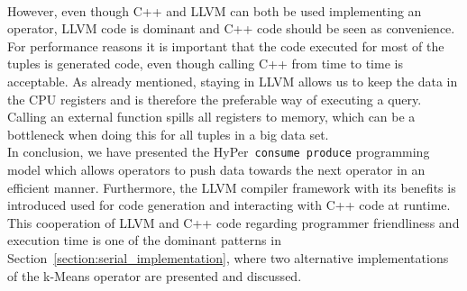 \\
However, even though C++ and LLVM can both be used implementing an operator, LLVM code is dominant and C++ code should be seen as convenience. For performance reasons it is important that the code executed for most of the tuples is generated code, even though calling C++ from time to time is acceptable. As already mentioned, staying in LLVM allows us to keep the data in the CPU registers and is therefore the preferable way of executing a query. Calling an external function spills all registers to memory, which can be a bottleneck when doing this for all tuples in a big data set.
\\
In conclusion, we have presented the HyPer~\texttt{consume produce} programming model which allows operators to push data towards the next operator in an efficient manner. Furthermore, the LLVM compiler framework with its benefits is introduced used for code generation and interacting with C++ code at runtime. 
This cooperation of LLVM and C++ code regarding programmer friendliness and execution time is one of the dominant patterns in Section~\ref{section:serial_implementation}, where two alternative implementations of the k-Means operator are presented and discussed. 


